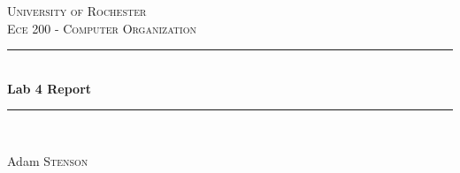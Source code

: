 \begin{titlepage}

\newcommand{\HRule}{\rule{\linewidth}{0.5mm}} %

\center %


\textsc{\LARGE University of Rochester}\\[1.5cm] %
\textsc{\large Ece 200 - Computer Organization}\\[0.5cm] %


\HRule \\[0.4cm]
{ \huge \bfseries Lab 4 Report}\\[0.4cm] %
\HRule \\[1.5cm]


\begin{minipage}{0.4\textwidth}
\begin{center}
\large
Adam \textsc{Stenson}
\end{center}
\end{minipage}
~



\end{titlepage}
